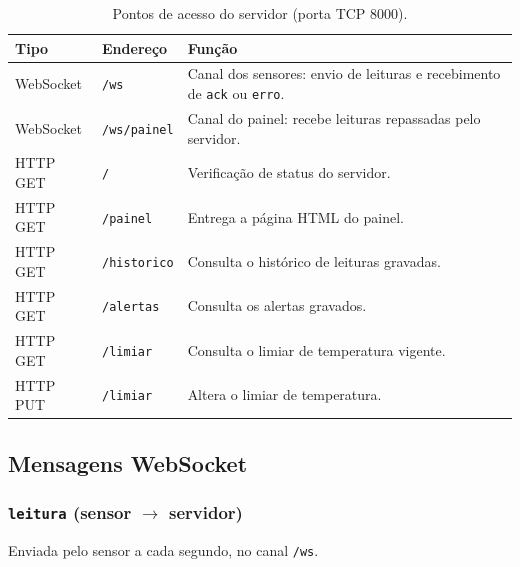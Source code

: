 \documentclass[12pt,a4paper]{article}
\begin{document}
\begin{table}[h]
\centering
\small
\begin{tabular}{@{}llp{7.2cm}@{}}
\toprule
\textbf{Tipo} & \textbf{Endere\c{c}o} & \textbf{Fun\c{c}\~ao} \\
\midrule
WebSocket & \texttt{/ws} & Canal dos sensores: envio de leituras e recebimento de \texttt{ack} ou \texttt{erro}. \\
WebSocket & \texttt{/ws/painel} & Canal do painel: recebe leituras repassadas pelo servidor. \\
HTTP GET  & \texttt{/} & Verifica\c{c}\~ao de status do servidor. \\
HTTP GET  & \texttt{/painel} & Entrega a p\'agina HTML do painel. \\
HTTP GET  & \texttt{/historico} & Consulta o hist\'orico de leituras gravadas. \\
HTTP GET  & \texttt{/alertas} & Consulta os alertas gravados. \\
HTTP GET  & \texttt{/limiar} & Consulta o limiar de temperatura vigente. \\
HTTP PUT  & \texttt{/limiar} & Altera o limiar de temperatura. \\
\bottomrule
\end{tabular}
\caption{Pontos de acesso do servidor (porta TCP 8000).}
\label{tab:endpoints}
\end{table}

\subsection{Mensagens WebSocket}

\subsubsection{\texttt{leitura} (sensor $\rightarrow$ servidor)}

Enviada pelo sensor a cada segundo, no canal \texttt{/ws}.
\end{document}
